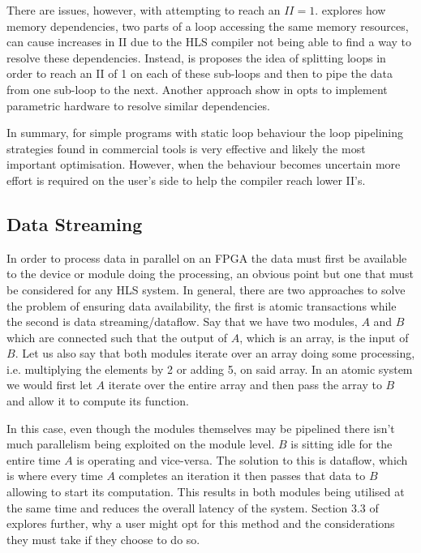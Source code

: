 There are issues, however, with attempting to reach an $II = 1$. \cite{7544750} explores how memory dependencies, two parts of a loop accessing the same memory resources, can cause increases in II due to the HLS compiler not being able to find a way to resolve these dependencies. Instead, is proposes the idea of splitting loops in order to reach an II of 1 on each of these sub-loops and then to pipe the data from one sub-loop to the next. Another approach show in \cite{7160061} opts to implement parametric hardware to resolve similar dependencies. 

In summary, for simple programs with static loop behaviour the loop pipelining strategies found in commercial tools is very effective and likely the most important optimisation. However, when the behaviour becomes uncertain more effort is required on the user's side to help the compiler reach lower II's.

\subsection{Data Streaming}

In order to process data in parallel on an FPGA the data must first be available to the device or module doing the processing, an obvious point but one that must be considered for any HLS system. In general, there are two approaches to solve the problem of ensuring data availability, the first is atomic transactions while the second is data streaming/dataflow. Say that we have two modules, $A$ and $B$ which are connected such that the output of $A$, which is an array, is the input of $B$. Let us also say that both modules iterate over an array doing some processing, i.e. multiplying the elements by 2 or adding 5, on said array. In an atomic system we would first let $A$ iterate over the entire array and then pass the array to $B$ and allow it to compute its function. 

In this case, even though the modules themselves may be pipelined there isn't much parallelism being exploited on the module level. $B$ is sitting idle for the entire time $A$ is operating and vice-versa. The solution to this is dataflow, which is where every time $A$ completes an iteration it then passes that data to $B$ allowing to start its computation. This results in both modules being utilised at the same time and reduces the overall latency of the system. Section 3.3 of \cite{9264692} explores further, why a user might opt for this method and the considerations they must take if they choose to do so. 

